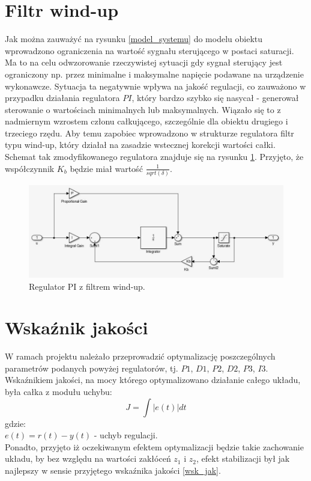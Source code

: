\section{Filtr wind-up}
Jak można zauważyć na rysunku \ref{model_systemu} do modelu obiektu wprowadzono ograniczenia na wartość sygnału sterującego w postaci saturacji. Ma to na celu odwzorowanie rzeczywistej sytuacji gdy sygnał sterujący jest ograniczony np. przez minimalne i maksymalne napięcie podawane na urządzenie wykonawcze. Sytuacja ta negatywnie wpływa na jakość regulacji, co zauważono w przypadku działania regulatora $PI$, który bardzo szybko się nasycał - generował sterowanie o wartościach minimalnych lub maksymalnych. Wiązało się to z nadmiernym wzrostem członu całkującego, szczególnie dla obiektu drugiego i trzeciego rzędu. Aby temu zapobiec wprowadzono w strukturze regulatora filtr typu wind-up, który działał na zasadzie wstecznej korekcji wartości całki. Schemat tak zmodyfikowanego regulatora znajduje się na rysunku \ref{windUp}. Przyjęto, że współczynnik $K_b$ będzie miał wartość $\frac{1}{sqrt(\delta)}$.

\begin{figure}[h!]
	\centering
	\includegraphics[scale = 0.6]{fig/windUp.jpg}
	\caption		
	{Regulator PI z filtrem wind-up.}
	\label{windUp}
\end{figure} 

\section{Wska\'znik jakości}
W ramach projektu należało przeprowadzić optymalizację poszczególnych parametrów podanych powyżej regulatorów, tj. $P1$, $D1$, $P2$, $D2$, $P3$, $I3$. Wskaźnikiem jakości, na mocy którego optymalizowano działanie całego układu, była całka z modułu uchybu:
\begin{equation}\label{wsk_jak}
J = \int |e(t)| dt
\end{equation}
gdzie: \\
$e(t) = r(t) - y(t)$ - uchyb regulacji.\\ 

 Ponadto, przyjęto iż oczekiwanym efektem optymalizacji będzie takie zachowanie układu, by bez względu na wartości zakłóceń $z_1$ i $z_2$, efekt stabilizacji był jak najlepszy w sensie przyjętego wska\'znika jakości \ref{wsk_jak}.

